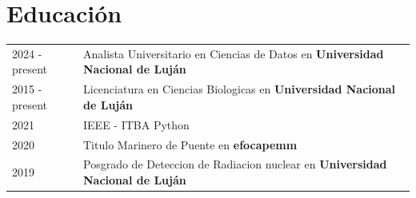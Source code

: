 \documentclass[a4paper,12pt]{article}
\begin{document}
\section{Educación}
\begin{tabularx}{\linewidth}{@{}l X@{}}	
2024 - present & Analista Universitario en Ciencias de Datos en \textbf{Universidad Nacional de Luján}  \\
2015 - present & Licenciatura en Ciencias Biologicas en \textbf{Universidad Nacional de Luján} \\

2021 & IEEE - ITBA Python \\

2020 & Titulo Marinero de Puente en \textbf{efocapemm} \hfill \\

2019 & Posgrado de Deteccion de Radiacion nuclear en \textbf{Universidad Nacional de Luján} \\
\end{tabularx}



\end{document}
